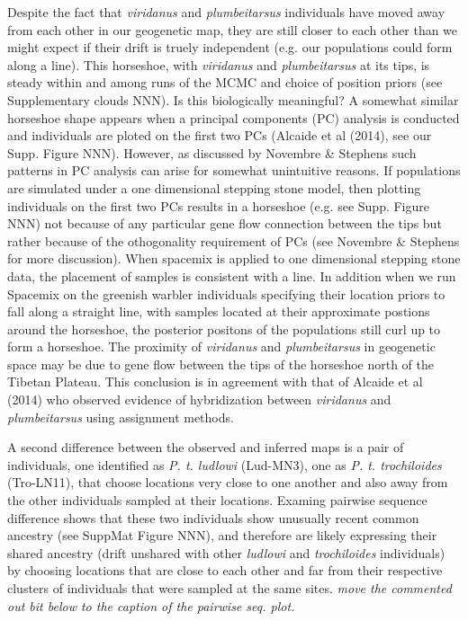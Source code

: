 \documentclass[12pt]{article}
\newcommand{\gc}[1]{{\em \color{blue} #1}}
\begin{document}
Despite the fact that \textit{viridanus} and \textit{plumbeitarsus} individuals have moved away from each other in our geogenetic map, they are still closer to each other than we might expect if their drift is truely independent (e.g. our populations could form along a line). This horseshoe, with \textit{viridanus} and \textit{plumbeitarsus} at its tips, is steady within and among runs of the MCMC and choice of position priors (see Supplementary clouds NNN). Is this biologically meaningful? A somewhat similar horseshoe shape appears when a principal components (PC) analysis is conducted and individuals are ploted on the first two PCs (Alcaide et al (2014), see our Supp. Figure NNN). However, as discussed by Novembre \& Stephens such patterns in PC analysis can arise for somewhat unintuitive reasons. If populations are simulated under a one dimensional stepping stone model, then plotting individuals on the first two PCs results in a horseshoe (e.g. see Supp. Figure NNN) not because of any particular gene flow connection between the tips but rather because of the othogonality requirement of PCs (see Novembre \& Stephens for more discussion). When spacemix is applied to one dimensional stepping stone data, the placement of samples is consistent with a line. In addition when we run Spacemix on the greenish warbler individuals specifying their location priors to fall along a straight line, with samples located at their approximate postions around the horseshoe, the posterior positons of the populations still curl up to form a horseshoe. The proximity of \textit{viridanus} and \textit{plumbeitarsus}  in geogenetic space may be due to gene flow between the tips of the horseshoe north of the Tibetan Plateau. This conclusion is in agreement with that of Alcaide et al (2014) who observed evidence of hybridization between \textit{viridanus} and \textit{plumbeitarsus} using assignment methods.

A second difference between the observed and inferred maps is a pair of individuals, one identified as \textit{P. t. ludlowi} (Lud-MN3), one as \textit{P. t. trochiloides} (Tro-LN11), that choose locations very close to one another and also away from the other individuals sampled at their locations. Examing pairwise sequence difference shows that these two individuals show unusually recent common ancestry (see SuppMat Figure NNN), and therefore are likely expressing their shared ancestry (drift unshared with other \textit{ludlowi} and \textit{trochiloides} individuals) by choosing locations that are close to each other and far from their respective clusters of individuals that were sampled at the same sites. \gc{move the commented out bit below to the caption of the pairwise seq. plot. }
\end{document}
